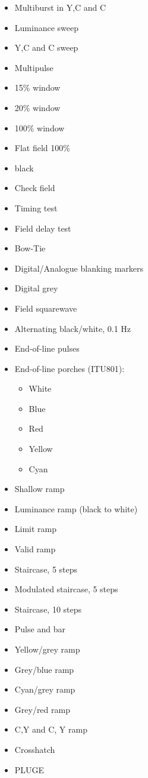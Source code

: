 \begin{itemize}
\item Multiburst in Y,C\raisebox{-0.7ex}{B} and C\raisebox{-0.7ex}{R}
\item Luminance sweep
\item Y,C\raisebox{-0.7ex}{B} and C\raisebox{-0.7ex}{R} sweep
\item Multipulse
\item 15\% window
\item 20\% window
\item 100\% window
\item Flat field 100\%
\item black
\item Check field
\item Timing test
\item Field delay test
\item Bow-Tie
\item Digital/Analogue blanking markers
\item Digital grey
\item Field squarewave
\item Alternating black/white, 0.1 Hz
\item End-of-line pulses
\item End-of-line porches (ITU801):
\begin{itemize}
\item White
\item Blue
\item Red
\item Yellow
\item Cyan
\end{itemize}
\item Shallow ramp
\item Luminance ramp (black to white)
\item Limit ramp
\item Valid ramp
\item Staircase, 5 steps
\item Modulated staircase, 5 steps
\item Staircase, 10 steps
\item Pulse and bar
\item Yellow/grey ramp
\item Grey/blue ramp
\item Cyan/grey ramp
\item Grey/red ramp
\item C\raisebox{-0.7ex}{B},Y and C\raisebox{-0.7ex}{R}, Y ramp
\item Crosshatch
\item PLUGE

\end{itemize}
